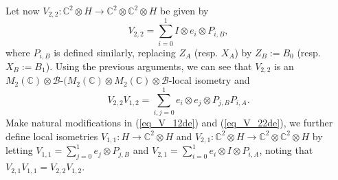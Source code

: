 \documentclass[11pt]{amsart}
\theoremstyle{definition}
\newcommand{\cl}[1]{\mathcal{#1}}
\newcommand{\bb}[1]{\mathbb{#1}}
\begin{document}
Let now $V_{2,2}: \mathbb C^2\otimes H\to \mathbb C^2\otimes\mathbb C^2\otimes H$ be given by
\begin{equation}\label{eq_V_22de}
V_{2,2}=\sum_{i=0}^1 I\otimes e_i\otimes P_{i,B}, 
\end{equation}
where $P_{i,B}$ is defined similarly, replacing  $Z_A$ 
(resp. $X_A$) by $Z_B := B_0$ 
(resp. $X_B := B_1$). 
Using the previous arguments, we can see that $V_{2,2}$ is an $M_2(\mathbb C)\otimes\cl B$-$(M_2(\mathbb C)\otimes M_2(\mathbb C)\otimes\cl B$-local isometry and 
$$V_{2,2}V_{1,2}=\sum_{i,j=0}^1 e_i\otimes e_j\otimes P_{j,B}P_{i,A}.$$
Make natural modifications in 
(\ref{eq_V_12de}) and (\ref{eq_V_22de}), 
we further define local isometries $V_{1,1}:H\to\mathbb C^2\otimes H$
and $V_{2,1} : \mathbb C^2\otimes H \to \mathbb C^2\otimes \bb{C}^2 \otimes H$
by letting
$V_{1,1} = \sum_{j=0}^1 e_j\otimes P_{j,B}$ and 
$V_{2,1}=\sum_{i=0}^1 e_i\otimes I\otimes P_{i,A}$, 
noting that $V_{2,1}V_{1,1}=V_{2,2}V_{1,2}$.
\end{document}
